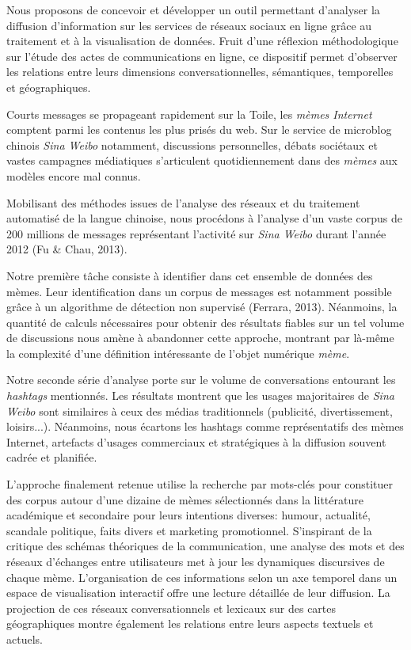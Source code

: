 \documentclass[12pt,a4paper]{article} %
\begin{document}
\begin{spacing}{1.5} %

Nous proposons de concevoir et développer un outil permettant d’analyser la diffusion d’information sur les services de réseaux sociaux en ligne grâce au traitement et à la visualisation de données. Fruit d’une réflexion méthodologique sur l’étude des actes de communications en ligne, ce dispositif permet d’observer les relations entre leurs dimensions conversationnelles, sémantiques, temporelles et géographiques.

Courts messages se propageant rapidement sur la Toile, les \textit{mèmes Internet} comptent parmi les contenus les plus prisés du web. Sur le service de microblog chinois \textit{Sina Weibo} notamment, discussions personnelles, débats sociétaux et vastes campagnes médiatiques s’articulent quotidiennement dans des \textit{mèmes} aux modèles encore mal connus.

Mobilisant des méthodes issues de l’analyse des réseaux et du traitement automatisé de la langue chinoise, nous procédons à l’analyse d’un vaste corpus de 200 millions de messages représentant l’activité sur \textit{Sina Weibo} durant l’année 2012 (Fu \& Chau, 2013). 

Notre première tâche consiste à identifier dans cet ensemble de données des mèmes. Leur identification dans un corpus de messages est notamment possible grâce à un algorithme de détection non supervisé (Ferrara, 2013). Néanmoins, la quantité de calculs nécessaires pour obtenir des résultats fiables sur un tel volume de discussions nous amène à abandonner cette approche, montrant par là-même la complexité d’une définition intéressante de l'objet numérique \textit{mème}.

Notre seconde série d’analyse porte sur le volume de conversations entourant les \textit{hashtags} mentionnés. Les résultats montrent que les usages majoritaires de \textit{Sina Weibo} sont similaires à ceux des médias traditionnels (publicité, divertissement, loisirs...). Néanmoins, nous écartons les hashtags comme représentatifs des mèmes Internet, artefacts d’usages commerciaux et stratégiques à la diffusion souvent cadrée et planifiée. 

L’approche finalement retenue utilise la recherche par mots-clés pour constituer des corpus autour d’une dizaine de mèmes sélectionnés dans la littérature académique et secondaire pour leurs intentions diverses: humour, actualité, scandale politique, faits divers et marketing promotionnel. S’inspirant de la critique des schémas théoriques de la communication, une analyse des mots et des réseaux d’échanges entre utilisateurs met à jour les dynamiques discursives de chaque mème. L’organisation de ces informations selon un axe temporel dans un espace de visualisation interactif offre une lecture détaillée de leur diffusion. La projection de ces réseaux conversationnels et lexicaux sur des cartes géographiques montre également les relations entre leurs aspects textuels et actuels.


\end{spacing}
\end{document}
